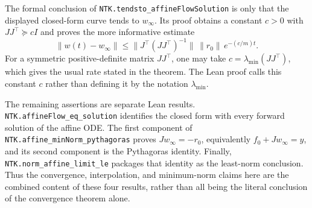 \begin{remark}\label{rmk:ntkgf:affineLimitLean}
  \leanok
The formal conclusion of \texttt{NTK.tendsto\_affineFlowSolution} is only that the displayed
closed-form curve tends to $w_\infty$. Its proof obtains a constant $c>0$ with
$JJ^\top\succeq cI$ and proves the more informative estimate
\[
  \|w(t)-w_\infty\|
  \leq \bigl\|J^\top(JJ^\top)^{-1}\bigr\|\,\|r_0\|\,e^{-(c/m)t}.
\]
For a symmetric positive-definite matrix $JJ^\top$, one may take $c=\lambda_{\min}(JJ^\top)$,
which gives the usual rate stated in the theorem. The Lean proof calls this constant $c$ rather
than defining it by the notation $\lambda_{\min}$.

The remaining assertions are separate Lean results. \texttt{NTK.affineFlow\_eq\_solution} identifies
the closed form with every forward solution of the affine ODE. The first component of
\texttt{NTK.affine\_minNorm\_pythagoras} proves $Jw_\infty=-r_0$, equivalently
$f_0+Jw_\infty=y$, and its second component is the Pythagoras identity. Finally,
\texttt{NTK.norm\_affine\_limit\_le} packages that identity as the least-norm conclusion.
Thus the convergence, interpolation, and minimum-norm claims here are the combined content of
these four results, rather than all being the literal conclusion of the convergence theorem alone.
\end{remark}

